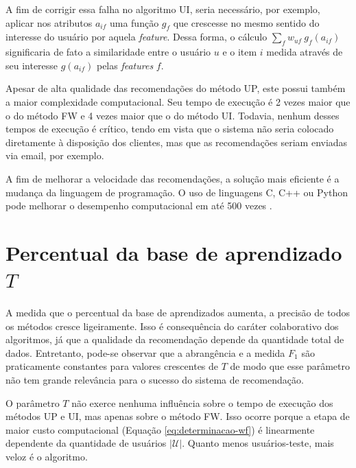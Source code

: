 A fim de corrigir essa falha no algoritmo UI, seria necessário, por exemplo, aplicar nos atributos $a_{if}$ uma função $g_f$ que crescesse no mesmo sentido do interesse do usuário por aquela \textit{feature}. Dessa forma, o cálculo $\sum_f w_{uf}~g_f\left(a_{if}\right)$ significaria de fato a similaridade entre o usuário $u$ e o item $i$ medida através de seu interesse $g\left(a_{if}\right)$ pelas \textit{features} $f$.

Apesar de alta qualidade das recomendações do método UP, este possui também a maior complexidade computacional. Seu tempo de execução é 2 vezes maior que o do método FW e 4 vezes maior que o do método UI. Todavia, nenhum desses tempos de execução é crítico, tendo em vista que o sistema não seria colocado diretamente à disposição dos clientes, mas que as recomendações seriam enviadas via email, por exemplo. 

A fim de melhorar a velocidade das recomendações, a solução mais eficiente é a mudança da linguagem de programação. O uso de linguagens C, C++ ou Python pode melhorar o desempenho computacional em até 500 vezes \cite{benchmarkingR}. 

\section{Percentual da base de aprendizado $T$} %
\label{sec:percentual_da_base_de_aprendizado_}

A medida que o percentual da base de aprendizados aumenta, a precisão de todos os métodos cresce ligeiramente. Isso é consequência do caráter colaborativo dos algoritmos, já que a qualidade da recomendação depende da quantidade total de dados. Entretanto, pode-se observar que a abrangência e a medida $F_1$ são praticamente constantes para valores crescentes de $T$ de modo que esse parâmetro não tem grande relevância para o sucesso do sistema de recomendação.

O parâmetro $T$ não exerce nenhuma influência sobre o tempo de execução dos métodos UP e UI, mas apenas sobre o método FW. Isso ocorre porque a etapa de maior custo computacional (Equação \ref{eq:determinacao-wf}) é linearmente dependente da quantidade de usuários $\left|\mathcal{U}\right|$. Quanto menos usuários-teste, mais veloz é o algoritmo.

